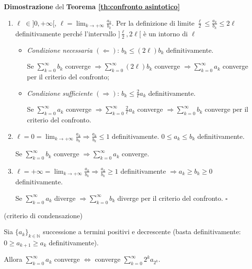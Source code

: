 \begin{dembar}
	\textbf{Dimostrazione} del \textbf{Teorema \ref{th:confronto asintotico}}
	\begin{enumerate}
		\item $\ell \; \in ]0,+\infty[$, $\ell = \lim_{k\rightarrow+\infty} \frac{a_k}{b_k}$. Per la definizione di limite $\frac{\ell}{2} \leq \frac{a_k}{b_k} \leq 2\ell$ definitivamente perché l'intervallo $]\frac{\ell}{2}, 2\ell[$ è un intorno di $\ell$
		\begin{itemize}
			\item \textit{Condizione necessaria $(\Leftarrow)$}: $b_k \leq (2\ell) b_k$ definitivamente. 
			
			Se $\sum_{k=0}^\infty b_k$ converge $\Rightarrow \sum_{k=0}^\infty (2\ell) b_k$ converge $\Rightarrow \sum_{k=0}^\infty a_k$ converge per il criterio del confronto;
			
			\item \textit{Condizione sufficiente $(\Rightarrow)$}: $b_k \leq \frac{2}{\ell} a_k$ definitivamente.
			
			Se $\sum_{k=0}^\infty a_k$ converge $\Rightarrow \sum_{k=0}^\infty \frac{2}{\ell} a_k$ converge $\Rightarrow \sum_{k=0}^{\infty} b_k$ converge per il criterio del confronto.
		\end{itemize}
		
		\item $\ell=0=\lim_{k\rightarrow+\infty} \frac{a_k}{b_k} \Rightarrow \frac{a_k}{b_k} \leq 1$ definitivamente. $0 \leq a_k \leq b_k$ definitivamente. 
		
		Se $\sum_{k=0}^\infty b_k$ converge $\Rightarrow \sum_{k=0}^\infty a_k$ converge.
		
		\item $\ell = +\infty = \lim_{k\rightarrow+\infty} \frac{a_k}{b_k} \Rightarrow \frac{a_k}{b_k} \geq 1$ definitivamente $\Rightarrow a_k \geq b_k \geq 0$ definitivamente.
		
		Se $\sum_{k=0}^\infty a_k$ diverge $\Rightarrow \sum_{k=0}^\infty b_k$ diverge per il criterio del confronto. $\square$
	\end{enumerate}
\end{dembar}

\begin{theorem} (criterio di condensazione)
	
	Sia $\{a_k \}_{k\in\mathbb{N}}$ successione a termini positivi e decrescente (basta definitivamente: \\ %
	 $0\geq a_{k+1} \geq a_k$ definitivamente). 
	
	Allora $\sum_{k=0}^\infty a_k$ converge $\iff$ converge $\sum_{k=0}^\infty 2^k a_{2^k}$.
\end{theorem}

